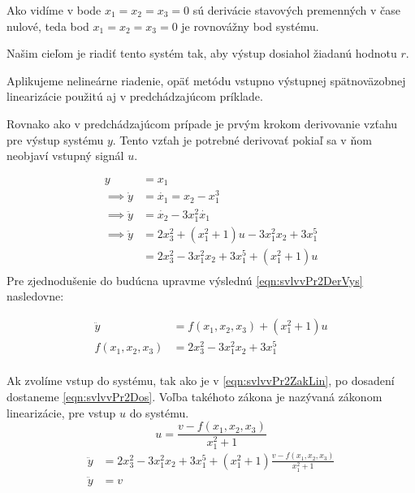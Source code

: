 \documentclass[../main.tex]{subfiles}
\begin{document}
		Ako vidíme v bode $x_1 = x_2 = x_3 = 0 $ sú derivácie stavových premenných v čase nulové, teda bod $x_1 = x_2 = x_3 = 0 $ je rovnovážny bod systému.
	
	Našim cieľom je riadiť tento systém tak, aby výstup dosiahol žiadanú hodnotu $r$.
	
	Aplikujeme nelineárne riadenie, opäť metódu vstupno výstupnej spätnoväzobnej linearizácie použitú aj v predchádzajúcom príklade. 
	
	Rovnako ako v predchádzajúcom prípade je prvým krokom derivovanie vzťahu pre výstup systému $y$. Tento vzťah je potrebné derivovať pokiaľ sa v ňom neobjaví vstupný signál $u$. 

 	\begin{equation}
	\begin{aligned}
	y &= x_1 \\ 
	\implies \dot{y}  &= \dot{x_1} =  x_2 - x_1^3 \\
	\implies \ddot{y} &= \dot{x_2} - 3x_1^2\dot{x_1} \\
	\implies \ddot{y} &= 2x_3^2 + (x_1^2 + 1)u - 3x_1^2x_2 + 3x_1^5 \\
	&= 2x_3^2 - 3x_1^2x_2 + 3x_1^5 + (x_1^2 + 1)u\\
	\end{aligned}
	\label{eqn:svlvvPr2DerVys}
	\end{equation}
	Pre zjednodušenie do budúcna upravme výslednú \cref{eqn:svlvvPr2DerVys} nasledovne:
	
	 \begin{equation}
	\begin{aligned}
	\ddot{y} &= f(x_1,x_2,x_3) + (x_1^2 + 1)u \\
	f(x_1,x_2,x_3) &= 2x_3^2 - 3x_1^2x_2 + 3x_1^5\\
	\end{aligned}
	\label{eqn:svlvvPr2DerUp}
	\end{equation}
	
	
	Ak zvolíme vstup do systému, tak ako je v \cref{eqn:svlvvPr2ZakLin}, po dosadení dostaneme \cref{eqn:svlvvPr2Dos}. Voľba takéhoto zákona je nazývaná zákonom linearizácie, pre vstup $u$ do systému.
	\begin{equation}
	u = \frac{v - f(x_1,x_2,x_3)}{x_1^2 + 1}
	\label{eqn:svlvvPr2ZakLin}
	\end{equation}
	\begin{equation}
	\begin{aligned}
	\ddot{y} &= 2x_3^2 - 3x_1^2x_2 + 3x_1^5 + (x_1^2 + 1)\frac{v - f(x_1,x_2,x_3)}{x_1^2 + 1} \\
	\ddot{y} &=v  \\ 
	\end{aligned}
	\label{eqn:svlvvPr2Dos}
	\end{equation}
	
\end{document}
